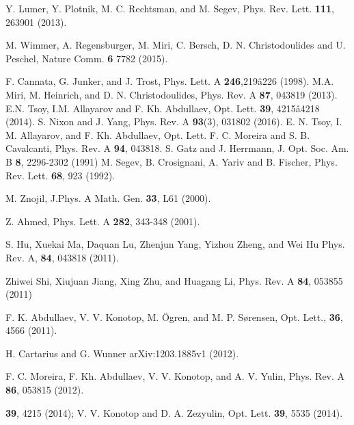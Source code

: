 \documentclass[aps,pre,showpacs,twocolumn]{revtex4}
\newcommand{\PT}{{\cal PT}}
\begin{document}
\begin{thebibliography}{99}
 Y. Lumer, Y. Plotnik, M. C. Rechtsman, and M. Segev, Phys. Rev. Lett. {\bf111}, 263901 (2013).

 M. Wimmer, A. Regensburger, M. Miri, C. Bersch, D. N. Christodoulides and U. Peschel, Nature Comm. {\bf6} 7782 (2015).


 F. Cannata, G. Junker, and J. Trost, Phys. Lett. A {\bf 246},219â226 (1998).
 M.A. Miri, M. Heinrich, and D. N. Christodoulides, Phys. Rev. A {\bf 87}, 043819 (2013).
 E.N. Tsoy, I.M. Allayarov and F. Kh. Abdullaev, Opt. Lett. {\bf 39}, 4215â4218 (2014).
 S. Nixon and J. Yang, Phys. Rev. A {\bf 93}(3), 031802 (2016).
 E. N. Tsoy, I. M. Allayarov, and F. Kh. Abdullaev, Opt. Lett.
 F. C. Moreira and S. B. Cavalcanti, Phys. Rev. A {\bf 94}, 043818.
 S. Gatz and J. Herrmann, J. Opt. Soc. Am. B {\bf 8}, 2296-2302 (1991)  
 M. Segev, B. Crosignani, A. Yariv and B. Fischer, Phys. Rev. Lett. {\bf 68}, 923 (1992).

M. Znojil, J.Phys. A Math. Gen. {\bf 33},  L61 (2000).


Z. Ahmed, Phys. Lett. A {\bf 282}, 343-348 (2001).

 S. Hu, Xuekai Ma, Daquan Lu, Zhenjun Yang, Yizhou Zheng, and Wei Hu    %
Phys. Rev. A, {\bf 84}, 043818  (2011).


 Zhiwei Shi, Xiujuan Jiang, Xing Zhu, and Huagang Li, Phys. Rev. A {\bf 84}, 053855 (2011)

 F. K. Abdullaev, V. V. Konotop, M. \"Ogren, and M. P. S\o rensen,
Opt. Lett., {\bf 36}, 4566 (2011).

 H. Cartarius and G. Wunner  arXiv:1203.1885v1 (2012).

 F. C. Moreira, F. Kh. Abdullaev, V. V. Konotop, and A. V. Yulin, Phys. Rev. A {\bf 86}, 053815 (2012).











\textbf{39}, 4215 (2014); V. V. Konotop and D. A. Zezyulin, Opt. Lett. \textbf{39}, 5535 (2014).










\end{thebibliography}
\end{document}

